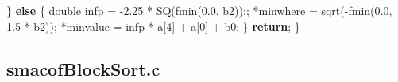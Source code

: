 \documentclass[
  12pt,
  letterpaper,
  DIV=11,
  numbers=noendperiod]{scrreprt}
\newenvironment{Shaded}{\begin{snugshade}}{\end{snugshade}}
\newcommand{\ControlFlowTok}[1]{\textcolor[rgb]{0.00,0.23,0.31}{\textbf{#1}}}
\newcommand{\DataTypeTok}[1]{\textcolor[rgb]{0.68,0.00,0.00}{#1}}
\newcommand{\DecValTok}[1]{\textcolor[rgb]{0.68,0.00,0.00}{#1}}
\newcommand{\FloatTok}[1]{\textcolor[rgb]{0.68,0.00,0.00}{#1}}
\newcommand{\NormalTok}[1]{\textcolor[rgb]{0.00,0.23,0.31}{#1}}
\newcommand{\OperatorTok}[1]{\textcolor[rgb]{0.37,0.37,0.37}{#1}}
\theoremstyle{remark}
\begin{document}
\begin{Shaded}
\begin{Highlighting}[]
    \OperatorTok{\}} \ControlFlowTok{else} \OperatorTok{\{}
        \DataTypeTok{double}\NormalTok{ infp }\OperatorTok{=} \OperatorTok{{-}}\FloatTok{2.25} \OperatorTok{*}\NormalTok{ SQ}\OperatorTok{(}\NormalTok{fmin}\OperatorTok{(}\FloatTok{0.0}\OperatorTok{,}\NormalTok{ b2}\OperatorTok{));;}
        \OperatorTok{*}\NormalTok{minwhere }\OperatorTok{=}\NormalTok{ sqrt}\OperatorTok{({-}}\NormalTok{fmin}\OperatorTok{(}\FloatTok{0.0}\OperatorTok{,} \FloatTok{1.5} \OperatorTok{*}\NormalTok{ b2}\OperatorTok{));}
        \OperatorTok{*}\NormalTok{minvalue }\OperatorTok{=}\NormalTok{ infp }\OperatorTok{*}\NormalTok{ a}\OperatorTok{[}\DecValTok{4}\OperatorTok{]} \OperatorTok{+}\NormalTok{ a}\OperatorTok{[}\DecValTok{0}\OperatorTok{]} \OperatorTok{+}\NormalTok{ b0}\OperatorTok{;}
    \OperatorTok{\}}
    \ControlFlowTok{return}\OperatorTok{;}
\OperatorTok{\}}
\end{Highlighting}
\end{Shaded}

\subsection*{smacofBlockSort.c}\label{smacofblocksort.c}
\end{document}
